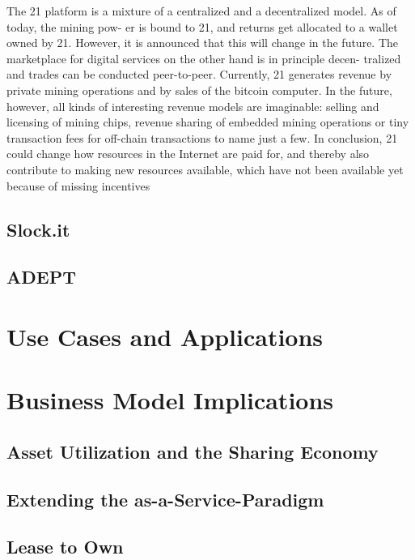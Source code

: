 The 21 platform is a mixture of a centralized and a decentralized model. As of today, the mining pow- er is bound to 21, and returns get allocated to a wallet owned by 21. However, it is announced that this will change in the future. The marketplace for digital services on the other hand is in principle decen- tralized and trades can be conducted peer-to-peer. Currently, 21 generates revenue by private mining operations and by sales of the bitcoin computer. In the future, however, all kinds of interesting revenue models are imaginable: selling and licensing of mining chips, revenue sharing of embedded mining operations or tiny transaction fees for off-chain transactions to name just a few.
In conclusion, 21 could change how resources in the Internet are paid for, and thereby also contribute to making new resources available, which have not been available yet because of missing incentives


\subsection{Slock.it}

\subsection{ADEPT}


\section{Use Cases and Applications}

\section{Business Model Implications}






\subsection{Asset Utilization and the Sharing Economy}

\subsection{Extending the as-a-Service-Paradigm}

\subsection{Lease to Own}

